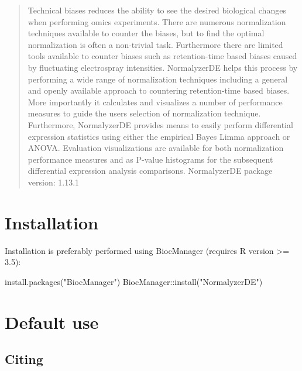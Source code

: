 \documentclass[]{article}
\author{Jakob Willforss, Aakash Chawade and Fredrik Levander}
\date{09/07/2023}
\renewenvironment{verbatim}{\color{codecolor}\begin{myshaded}\begin{oldverbatim}}{\end{oldverbatim}\end{myshaded}}
\begin{document}
\maketitle
\begin{abstract}
Technical biases reduces the ability to see the desired biological changes when performing omics experiments. There are numerous normalization techniques available to counter the biases, but to find the optimal normalization is often a non-trivial task. Furthermore there are limited tools available to counter biases such as retention-time based biases caused by fluctuating electrospray intensities. NormalyzerDE helps this process by performing a wide range of normalization techniques including a general and openly available approach to countering retention-time based biases. More importantly it calculates and visualizes a number of performance measures to guide the users selection of normalization technique. Furthermore, NormalyzerDE provides means to easily perform differential expression statistics using either the empirical Bayes Limma approach or ANOVA. Evaluation visualizations are available for both normalization performance measures and as P-value histograms for the subsequent differential expression analysis comparisons. NormalyzerDE package version: 1.13.1
\end{abstract}


{
\setcounter{tocdepth}{2}
\tableofcontents
\newpage
}
\hypertarget{installation}{%
\section{Installation}\label{installation}}

Installation is preferably performed using BiocManager (requires R version \textgreater= 3.5):

\begin{verbatim}
install.packages("BiocManager")
BiocManager::install("NormalyzerDE")
\end{verbatim}

\hypertarget{default-use}{%
\section{Default use}\label{default-use}}

\hypertarget{citing}{%
\subsection{Citing}\label{citing}}
\end{document}
